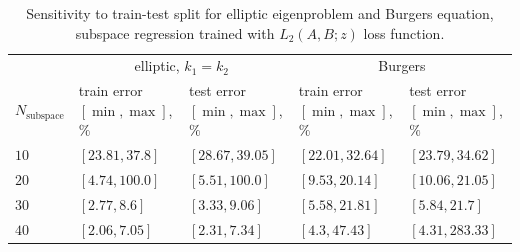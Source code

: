 \documentclass{article}
\begin{document}
\begin{table}[h!]
\caption{Sensitivity to train-test split for elliptic eigenproblem and Burgers equation, subspace regression trained with $L_2(A, B; z)$ loss function.}
\label{table:sensitivity_hyperparameters}
\begin{center}
\hspace*{-0.5cm}  
\begin{tabular}{lllll}
\toprule
& \multicolumn{2}{c}{elliptic, $k_1=k_2$} &  \multicolumn{2}{c}{Burgers}\\
\cmidrule(r){2-3}\cmidrule(r){4-5}
$N_{\text{subspace}}$ & \shortstack{train error \\ $[\min, \max]$, $\%$} & \shortstack{test error \\ $[\min, \max]$, $\%$}  &  \shortstack{train error \\ $[\min, \max]$, $\%$}  & \shortstack{test error \\ $[\min, \max]$, $\%$}  \\
\midrule
$10$ & $[23.81, 37.8]$ & $[28.67, 39.05]$ & $[22.01, 32.64]$ & $[23.79, 34.62]$ \\
$20$ & $[4.74, 100.0]$ & $[5.51, 100.0]$ & $[9.53, 20.14]$ & $[10.06, 21.05]$\\
$30$ & $[2.77, 8.6]$ & $[3.33, 9.06]$ & $[5.58, 21.81]$ & $[5.84, 21.7]$\\
$40$ & $[2.06, 7.05]$ & $[2.31, 7.34]$ & $[4.3, 47.43]$ &$[4.31, 283.33]$\\
\bottomrule
\end{tabular}
\end{center}
\end{table}
\end{document}
